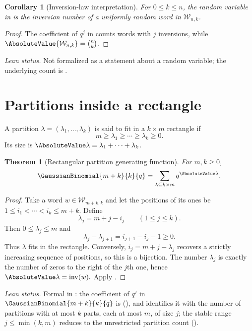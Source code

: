 \documentclass[11pt,a4paper,oneside,openany]{book}
\newtheorem{theorem}{Theorem}[chapter]
\newtheorem{corollary}[corollary]{Corollary}
\theoremstyle{definition}
\theoremstyle{remark}
\newcommand{\InversionNumber}[1]{\operatorname{inv}(#1)}
\begin{document}
\begin{corollary}[Inversion-law interpretation]\label{cor:qbinom-inversion-law}
For $0\le k\le n$, the random variable in  is the
inversion number of a uniformly random word in $\mathcal W_{n,k}$.
\end{corollary}

\begin{proof}
The coefficient of $q^j$ in  counts words with $j$ inversions, while $\AbsoluteValue{\mathcal W_{n,k}}=\binom nk$.
\end{proof}

\emph{Lean status.}  Not formalized as a statement about a random variable; the underlying
count is .


\section{Partitions inside a rectangle}

A partition $\lambda=(\lambda_1,\dots,\lambda_k)$ is said to fit in a $k\times m$ rectangle if
\[
 m\ge\lambda_1\ge\cdots\ge\lambda_k\ge0.
\]
Its size is $\AbsoluteValue\lambda=\lambda_1+\cdots+\lambda_k$.

\begin{theorem}[Rectangular partition generating function]\label{thm:rectangle-partitions}
For $m,k\ge0$,
\[
 \GaussianBinomial{m+k}{k}{q}
 =\sum_{\lambda\subseteq k\times m}q^{\AbsoluteValue\lambda}.
\]
\end{theorem}

\begin{proof}
Take a word $w\in\mathcal W_{m+k,k}$ and let the positions of its ones be
\(
 1\le i_1<\cdots<i_k\le m+k.
\)
Define
\[
 \lambda_j=m+j-i_j\qquad(1\le j\le k).
\]
Then $0\le\lambda_j\le m$ and
\[
 \lambda_j-\lambda_{j+1}=i_{j+1}-i_j-1\ge0.
\]
Thus $\lambda$ fits in the rectangle.  Conversely,
\(
 i_j=m+j-\lambda_j
\)
recovers a strictly increasing sequence of positions, so this is a bijection.  The number $\lambda_j$ is exactly the number of zeros to the right of the $j$th one, hence
\(
\AbsoluteValue\lambda=\InversionNumber{w}.
\)
Apply .
\end{proof}

\emph{Lean status.}  Formal in : the coefficient of $q^j$ in
$\GaussianBinomial{m+k}{k}{q}$ is  (),
and  identifies it with the number of partitions with at most
$k$ parts, each at most $m$, of size $j$; the stable range $j\le\min(k,m)$ reduces to the
unrestricted partition count ().
\end{document}
